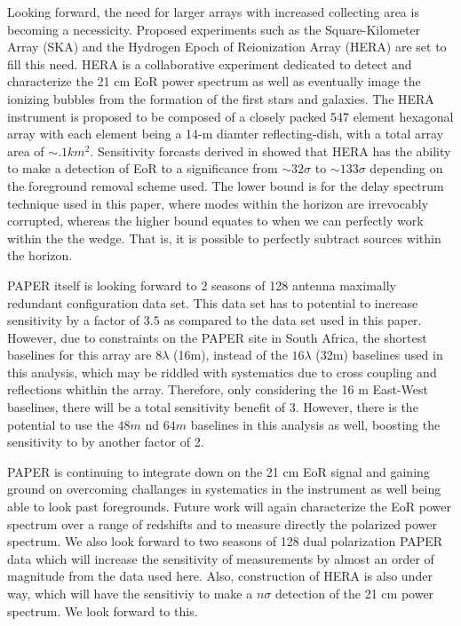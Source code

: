 \documentclass[twocolumn,numberedappendix]{emulateapj} \shorttitle{PSA64}
\begin{document}
Looking forward, the need for larger arrays with increased collecting area is
becoming a necessicity. Proposed experiments such as the Square-Kilometer Array
(SKA) and the Hydrogen Epoch of Reionization Array (HERA) are set to fill this
need. HERA is a collaborative experiment dedicated to detect and characterize
the 21 cm EoR power spectrum as well as eventually image the ionizing bubbles
from the formation of the first stars and galaxies. The HERA instrument
is proposed to be composed of a closely packed 547 element hexagonal array 
\citep{pober_et_al2014} with each element being a 14-m diamter
reflecting-dish, with a total array area of $\sim.1km^{2}$. Sensitivity forcasts
derived in \citet{pober_et_al2014} showed that HERA has the ability to make a
detection of EoR to a significance from $\sim32\sigma$ to $\sim133\sigma$
depending on the foreground removal scheme used. The lower bound is for the
delay spectrum technique used in this paper, where modes within the horizon are
irrevocably corrupted, whereas the higher bound equates to when we can perfectly
work within the the wedge. That is, it is possible to perfectly subtract sources
within the horizon.

PAPER itself is looking forward to 2 seasons of 128 antenna maximally redundant
configuration data set. This data set has to potential to increase  sensitivity
by a factor of $3.5$ as compared to the data set used in this paper. However,
due to constraints on the PAPER site in South Africa, the shortest baselines for
this array are $8\lambda$ (16m), instead of the $16\lambda$ (32m) baselines used
in this analysis, which may be riddled with systematics due to cross coupling
and reflections whithin the array. Therefore, only considering the 16 m
East-West baselines, there will be a total sensitivity benefit of $3$. However,
there is the potential to use the $48m$ nd $64m$ baselines in this analysis as
well, boosting the sensitivity to by another factor of 2. 

PAPER is continuing to integrate down on the 21 cm EoR signal and gaining ground
on overcoming challanges in systematics in the instrument as well being able to
look past foregrounds. Future work will again characterize the EoR power
spectrum over a range of redshifts and to measure directly the polarized power
spectrum. We also look forward to two seasons of 128 dual polarization PAPER
data which will increase the sensitivity of measurements by almost an order of
magnitude from the data used here. Also, construction of HERA is also under way,
which will have the sensitiviy to make a $n\sigma$ detection of the 21 cm power
spectrum. We look forward to this.
\end{document}
